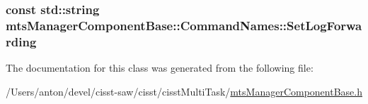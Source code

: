 \subsubsection[{Set\+Log\+Forwarding}]{\setlength{\rightskip}{0pt plus 5cm}const std\+::string mts\+Manager\+Component\+Base\+::\+Command\+Names\+::\+Set\+Log\+Forwarding\hspace{0.3cm}{\ttfamily [static]}}\label{classmts_manager_component_base_1_1_command_names_a494481ad11ce948eb96b3528361a9606}


The documentation for this class was generated from the following file\+:\begin{DoxyCompactItemize}
\item 
/\+Users/anton/devel/cisst-\/saw/cisst/cisst\+Multi\+Task/\hyperlink{mts_manager_component_base_8h}{mts\+Manager\+Component\+Base.\+h}\end{DoxyCompactItemize}
